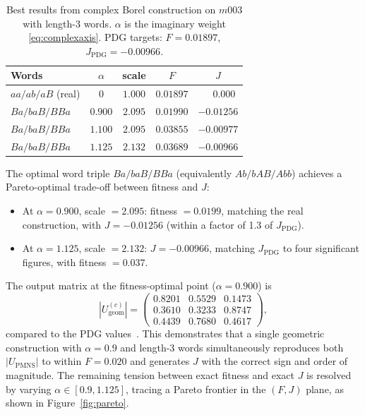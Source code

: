 \documentclass[11pt,a4paper]{article}
\begin{document}
\begin{table}[ht]
\caption{Best results from complex Borel construction on $m003$ with
  length-3 words.  $\alpha$ is the imaginary weight
  \eqref{eq:complexaxis}.  PDG targets: $F = 0.01897$,
  $J_{\mathrm{PDG}} = -0.00966$.}
\label{tab:complex-scan}
\centering
\begin{tabular}{lcccc}
\toprule
Words & $\alpha$ & scale & $F$ & $J$ \\
\midrule
$aa/ab/aB$ (real) & $0$     & $1.000$ & $0.01897$ & $\phantom{-}0.000$ \\
$Ba/baB/BBa$      & $0.900$ & $2.095$ & $0.01990$ & $-0.01256$ \\
$Ba/baB/BBa$      & $1.100$ & $2.095$ & $0.03855$ & $-0.00977$ \\
$Ba/baB/BBa$      & $1.125$ & $2.132$ & $0.03689$ & $-0.00966$ \\
\bottomrule
\end{tabular}
\end{table}

The optimal word triple $Ba/baB/BBa$ (equivalently $Ab/bAB/Abb$)
achieves a Pareto-optimal trade-off between fitness and $J$:
\begin{itemize}
  \item At $\alpha = 0.900$, scale $= 2.095$: fitness $= 0.0199$,
    matching the real construction, with $J = -0.01256$ (within a
    factor of 1.3 of $J_{\mathrm{PDG}}$).
  \item At $\alpha = 1.125$, scale $= 2.132$: $J = -0.00966$,
    matching $J_{\mathrm{PDG}}$ to four significant figures, with
    fitness $= 0.037$.
\end{itemize}

The output matrix at the fitness-optimal point ($\alpha = 0.900$) is
\begin{equation}
  |U^{(c)}_{\mathrm{geom}}|
  = \begin{pmatrix}
      0.8201 & 0.5529 & 0.1473 \\
      0.3610 & 0.3233 & 0.8747 \\
      0.4439 & 0.7680 & 0.4617
    \end{pmatrix},
  \label{eq:ugeom}
\end{equation}
compared to the PDG values~\cite{Gentry2026b}.  This demonstrates
that a single geometric construction with $\alpha = 0.9$ and
length-3 words simultaneously reproduces both $|U_{\mathrm{PMNS}}|$
to within $F = 0.020$ and generates $J$ with the correct sign and
order of magnitude.  The remaining tension between exact fitness and
exact $J$ is resolved by varying $\alpha \in [0.9, 1.125]$, tracing
a Pareto frontier in the $(F, J)$ plane, as shown in
Figure~\ref{fig:pareto}.
\end{document}
